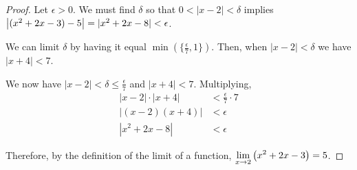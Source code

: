 \begin{proof}
  Let $\epsilon > 0$.
  We must find $\delta$ so that $0<|x-2|<\delta$ implies $\abs{(x^2+2x-3)-5}=|x^2+2x-8|<\epsilon$.

  We can limit $\delta$ by having it equal $\min(\{\frac\epsilon7,1\})$.
  Then, when $|x-2| < \delta$ we have $|x+4| < 7$.

  We now have $|x-2| < \delta \leq \frac\epsilon7$ and $|x+4| < 7$. Multiplying,
  \begin{align*}
    |x-2|\cdot|x+4| & < \frac\epsilon7\cdot7 \\
    |(x-2)(x+4)|    & < \epsilon             \\
    |x^2+2x-8|      & < \epsilon
  \end{align*}

  Therefore, by the \epsdel{} definition of the limit of a function, $\displaystyle\lim_{x\to2}\left(x^2+2x-3\right)=5$.
\end{proof}


